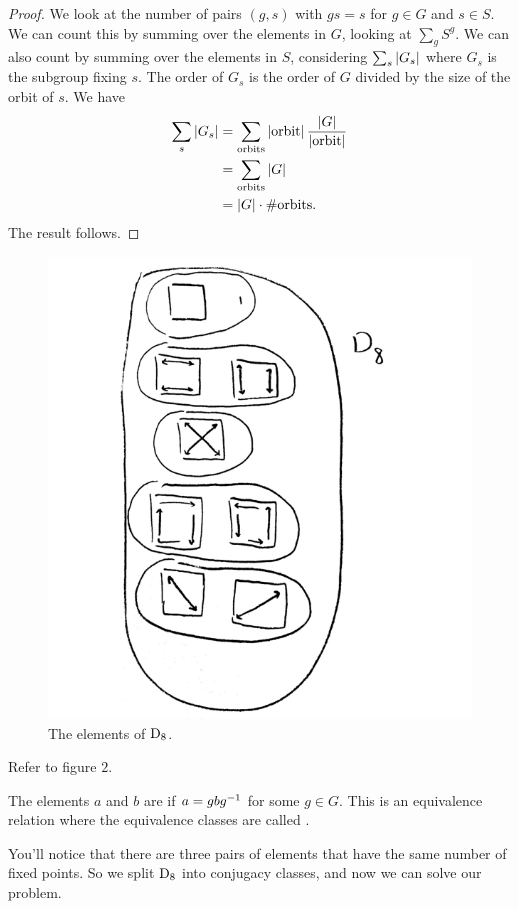 \documentclass[11pt, oneside]{amsart}
\begin{document}
\begin{proof}
We look at the number of pairs $(g,s)$ with $gs=s$ for $g\in G$ and $s\in S$. We can count this by summing over the elements in $G$, looking at $\sum_g S^g$. We can also count by summing over the elements in $S$, considering $\sum_s \left \lvert G_s \right \rvert$ where $G_s$ is the subgroup fixing $s$. The order of $G_s$ is the order of $G$ divided by the size of the orbit of $s$. We have
\begin{align*}
\sum_s \left \lvert G_s \right \rvert &= \sum_{\textrm{orbits}} \left \lvert \mathrm{orbit} \right \rvert \frac{\left \lvert G \right \rvert}{\left \lvert \mathrm{orbit} \right \rvert}\\
&= \sum_{\textrm{orbits}} \left \lvert G \right \rvert\\
&= \left \lvert G \right \rvert \cdot \# \mathrm{orbits}.
\end{align*}
The result follows.
\end{proof}
\begin{figure}
\centering
\includegraphics[scale=0.3]{images/thing}
\caption{The elements of $\operatorname{D}_8$.}
\end{figure}
Refer to figure $2$. 
\begin{definition}
The elements $a$ and $b$ are  if $a = gbg^{-1}$ for some $g\in G$. This is an equivalence relation where the equivalence classes are called .
\end{definition}
You'll notice that there are three pairs of elements that have the same number of fixed points. So we split $\operatorname{D}_8$ into conjugacy classes, and now we can solve our problem. 
\end{document}
